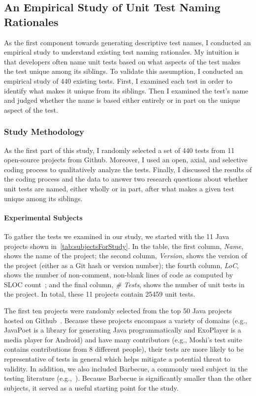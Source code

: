 \subsection{An Empirical Study of Unit Test Naming Rationales}
\label{sec:emp-study}

As the first component towards generating descriptive test names, I conducted an empirical study to understand existing test naming rationales.
%
My intuition is that developers often name unit tests based on what aspects of the test makes the test unique among its siblings.
%
To validate this assumption, I conducted an empirical study of \num{440} existing tests.
%
First, I examined each test in order to identify what makes it unique from its siblings.
%
Then I examined the test’s name and judged whether the name is based either entirely or in part on the unique aspect of the test.


\subsubsection{Study Methodology}

As the first part of this study, I randomly selected a set of \num{440} tests from \num{11} open-source projects from Github.
%
Moreover, I used an open, axial, and selective coding process to qualitatively analyze the tests.
%
Finally, I discussed the results of the coding process and the data to answer two research questions about whether unit tests are named, either wholly or in part, after what makes a given test unique among its siblings.


\paragraph{Experimental Subjects}

To gather the tests we examined in our study, we started with the \num{11} Java projects shown in~\cref{tab:subjectsForStudy}.
%
In the table, the first column, \emph{Name}, shows the name of the project; the second column, \emph{Version}, shows the version of the project (either as a Git hash or version number); the fourth column, \emph{LoC}, shows the number of non-comment, non-blank lines of code as computed by SLOC count~\cite{nguyen2007sloc}; and the final column, \emph{\# Tests}, shows the number of unit tests in the project. In total, these \num{11} projects contain \num{25459} unit tests.


The first ten projects were randomly selected from the top \num{50} Java projects hosted on Github~\cite{top50projects}.
%
Because these projects encompass a variety of domains (e.g., JavaPoet is a library for generating Java programmatically and ExoPlayer is a media player for Android) and have many contributors (e.g., Moshi’s test suite contains contributions from \num{8} different people), their tests are more likely to be representative of tests in general which helps mitigate a potential threat to validity.
%
In addition, we also included Barbecue, a commonly used subject in the testing literature (e.g.,~\cite{zhang2015automatically, zhang2016towards,wu2020pattern}).
%
Because Barbecue is significantly smaller than the other subjects, it served as a useful starting point for the study.


